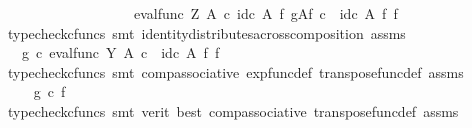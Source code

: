 \begin{isabellebody}
\ \ \ \ \ \ \ \ \ \ \ \ \ \ \ \ \ \ \ {\isacharparenleft}{\kern0pt}eval{\isacharunderscore}{\kern0pt}func\ Z\ A{\isacharparenright}{\kern0pt}\ {\isasymcirc}\isactrlsub c\ {\isacharparenleft}{\kern0pt}{\isacharparenleft}{\kern0pt}id\isactrlsub c\ A\ {\isasymtimes}\isactrlsub f\ {\isacharparenleft}{\kern0pt}g\isactrlbsup A\isactrlesup \isactrlsub f{\isacharparenright}{\kern0pt}{\isacharparenright}{\kern0pt}\ {\isasymcirc}\isactrlsub c\ \ {\isacharparenleft}{\kern0pt}id\isactrlsub c\ A\ {\isasymtimes}\isactrlsub f\ f\isactrlsup {\isasymsharp}{\isacharparenright}{\kern0pt}{\isacharparenright}{\kern0pt}{\isachardoublequoteclose}\isanewline
\ \ \ \ \ \ \isamarkupfalse%
\ {\isacharparenleft}{\kern0pt}typecheck{\isacharunderscore}{\kern0pt}cfuncs{\isacharcomma}{\kern0pt}\ smt\ identity{\isacharunderscore}{\kern0pt}distributes{\isacharunderscore}{\kern0pt}across{\isacharunderscore}{\kern0pt}composition\ assms{\isacharparenright}{\kern0pt}\isanewline
\ \ \ \ \isamarkupfalse%
\ \isamarkupfalse%
\ {\isachardoublequoteopen}{\isachardot}{\kern0pt}{\isachardot}{\kern0pt}{\isachardot}{\kern0pt}\ {\isacharequal}{\kern0pt}\ {\isacharparenleft}{\kern0pt}g\ {\isasymcirc}\isactrlsub c\ eval{\isacharunderscore}{\kern0pt}func\ Y\ A{\isacharparenright}{\kern0pt}\ {\isasymcirc}\isactrlsub c\ \ {\isacharparenleft}{\kern0pt}id\isactrlsub c\ A\ {\isasymtimes}\isactrlsub f\ f\isactrlsup {\isasymsharp}{\isacharparenright}{\kern0pt}{\isachardoublequoteclose}\isanewline
\ \ \ \ \ \ \isamarkupfalse%
\ {\isacharparenleft}{\kern0pt}typecheck{\isacharunderscore}{\kern0pt}cfuncs{\isacharcomma}{\kern0pt}\ smt\ comp{\isacharunderscore}{\kern0pt}associative{}\ exp{\isacharunderscore}{\kern0pt}func{\isacharunderscore}{\kern0pt}def{}\ transpose{\isacharunderscore}{\kern0pt}func{\isacharunderscore}{\kern0pt}def\ assms{\isacharparenright}{\kern0pt}\isanewline
\ \ \ \ \isamarkupfalse%
\ \isamarkupfalse%
\ {\isachardoublequoteopen}{\isachardot}{\kern0pt}{\isachardot}{\kern0pt}{\isachardot}{\kern0pt}\ {\isacharequal}{\kern0pt}\ g\ {\isasymcirc}\isactrlsub c\ f{\isachardoublequoteclose}\isanewline
\ \ \ \ \ \ \isamarkupfalse%
\ {\isacharparenleft}{\kern0pt}typecheck{\isacharunderscore}{\kern0pt}cfuncs{\isacharcomma}{\kern0pt}\ smt\ {\isacharparenleft}{\kern0pt}verit{\isacharcomma}{\kern0pt}\ best{\isacharparenright}{\kern0pt}\ comp{\isacharunderscore}{\kern0pt}associative{}\ transpose{\isacharunderscore}{\kern0pt}func{\isacharunderscore}{\kern0pt}def\ assms{\isacharparenright}{\kern0pt}\isanewline

\end{isabellebody}
